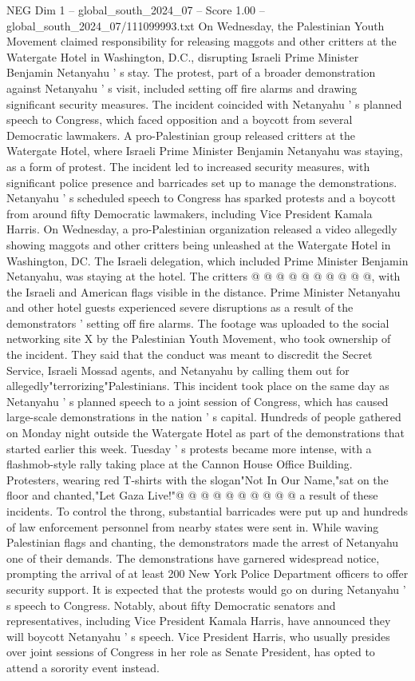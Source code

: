 \begin{textsample}{NEG Dim 1 – global\_south\_2024\_07 – Score 1.00 – global\_south\_2024\_07/111099993.txt}  \label{ex:f1_neg_273}
On Wednesday, the Palestinian Youth Movement claimed responsibility for releasing maggots and other critters at the Watergate Hotel in Washington, D.C., disrupting Israeli Prime Minister Benjamin Netanyahu ' s stay.
The protest, part of a broader demonstration against Netanyahu ' s visit, included setting off fire alarms and drawing significant security measures.
The incident coincided with Netanyahu ' s planned speech to Congress, which faced opposition and a boycott from several Democratic lawmakers.
A pro-Palestinian group released critters at the Watergate Hotel, where Israeli Prime Minister Benjamin Netanyahu was staying, as a form of protest.
The incident led to increased security measures, with significant police presence and barricades set up to manage the demonstrations.
Netanyahu ' s scheduled speech to Congress has sparked protests and a boycott from around fifty Democratic lawmakers, including Vice President Kamala Harris.
On Wednesday, a pro-Palestinian organization released a video allegedly showing maggots and other critters being unleashed at the Watergate Hotel in Washington, DC.
The Israeli delegation, which included Prime Minister Benjamin Netanyahu, was staying at the hotel.
The critters @ @ @ @ @ @ @ @ @ @, with the Israeli and American flags visible in the distance.
Prime Minister Netanyahu and other hotel guests experienced severe disruptions as a result of the demonstrators ' setting off fire alarms.
The footage was uploaded to the social networking site X by the Palestinian Youth Movement, who took ownership of the incident.
They said that the conduct was meant to discredit the Secret Service, Israeli Mossad agents, and Netanyahu by calling them out for allegedly"terrorizing"Palestinians.
This incident took place on the same day as Netanyahu ' s planned speech to a joint session of Congress, which has caused large-scale demonstrations in the nation ' s capital.
Hundreds of people gathered on Monday night outside the Watergate Hotel as part of the demonstrations that started earlier this week.
Tuesday ' s protests became more intense, with a flashmob-style rally taking place at the Cannon House Office Building.
Protesters, wearing red T-shirts with the slogan"Not In Our Name,"sat on the floor and chanted,"Let Gaza Live!"@ @ @ @ @ @ @ @ @ @ a result of these incidents.
To control the throng, substantial barricades were put up and hundreds of law enforcement personnel from nearby states were sent in.
While waving Palestinian flags and chanting, the demonstrators made the arrest of Netanyahu one of their demands.
The demonstrations have garnered widespread notice, prompting the arrival of at least 200 New York Police Department officers to offer security support.
It is expected that the protests would go on during Netanyahu ' s speech to Congress.
Notably, about fifty Democratic senators and representatives, including Vice President Kamala Harris, have announced they will boycott Netanyahu ' s speech.
Vice President Harris, who usually presides over joint sessions of Congress in her role as Senate President, has opted to attend a sorority event instead.

\end{textsample}
